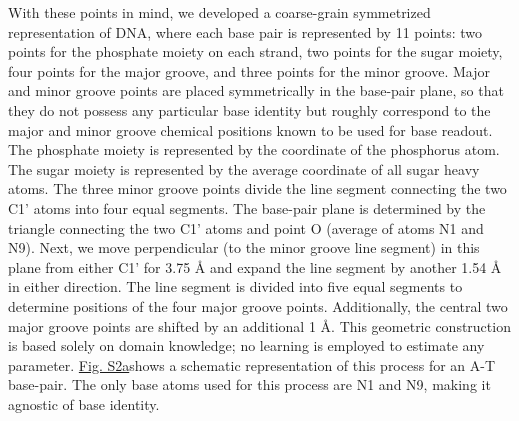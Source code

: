 With these points in mind, we developed a coarse-grain symmetrized representation of DNA, where each base pair is represented by 11 points: two points for the phosphate moiety on each strand, two points for the sugar moiety, four points for the major groove, and three points for the minor groove. Major and minor groove points are placed symmetrically in the base-pair plane, so that they do not possess any particular base identity but roughly correspond to the major and minor groove chemical positions known \citep{Chiu2023} to be used for base readout. The phosphate moiety is represented by the coordinate of the phosphorus atom. The sugar moiety is represented by the average coordinate of all sugar heavy atoms. The three minor groove points divide the line segment connecting the two C1' atoms into four equal segments. The base-pair plane is determined by the triangle connecting the two C1' atoms and point O (average of atoms N1 and N9). Next, we move perpendicular (to the minor groove line segment) in this plane from either C1' for 3.75 Å and expand the line segment by another 1.54 Å in either direction. The line segment is divided into five equal segments to determine positions of the four major groove points. Additionally, the central two major groove points are shifted by an additional 1 Å. This geometric construction is based solely on domain knowledge; no learning is employed to estimate any parameter. \hyperref[fig:pdnaS2]{Fig. S2a}shows a schematic representation of this process for an A-T base-pair. The only base atoms used for this process are N1 and N9, making it agnostic of base identity. 

